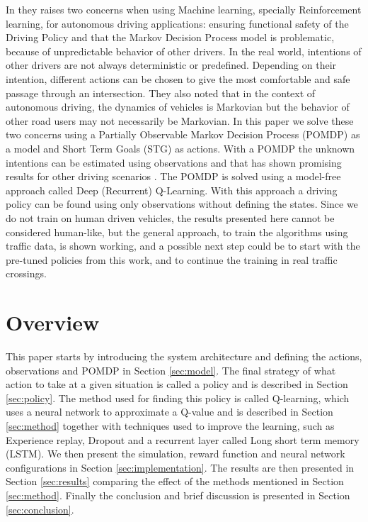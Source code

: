In \cite{Shalev2016} they raises two concerns when using Machine learning, specially Reinforcement learning, for autonomous driving applications: ensuring functional safety of the Driving Policy and that the Markov Decision Process model is problematic, because of unpredictable behavior of other drivers.
In the real world, intentions of other drivers are not always deterministic or predefined. Depending on their intention, different actions can be chosen to give the most comfortable and safe passage through an intersection.
They also noted that in the context of autonomous driving, the dynamics of vehicles is Markovian but the behavior of other road users may not necessarily be Markovian. In this paper we solve these two concerns using a Partially Observable Markov Decision Process (POMDP) as a model and Short Term Goals (STG) as actions. With a POMDP the unknown intentions can be estimated using observations and that has shown promising results for other driving scenarios \cite{Brechtel2014}. The POMDP is solved using a model-free approach called Deep (Recurrent) Q-Learning. With this approach a driving policy can be found using only observations without defining the states. Since we do not train on human driven vehicles, the results presented here cannot be considered  human-like, but the general approach, to train the algorithms using traffic data, is shown working, and  a possible next step could be to start with the pre-tuned policies from this work, and to continue the training in real traffic crossings.

\section{Overview}
This paper starts by introducing the system architecture and defining the actions, observations and POMDP in Section \ref{sec:model}. The final strategy of what action to take at a given situation is called a policy and is described in Section \ref{sec:policy}. The method used for finding this policy is called Q-learning, which uses a neural network to approximate a Q-value and is described in Section \ref{sec:method} together with techniques used to improve the learning, such as Experience replay, Dropout and a recurrent layer called Long short term memory (LSTM). We then present the simulation, reward function and neural network configurations in Section \ref{sec:implementation}. The results are then presented in Section \ref{sec:results} comparing the effect of the methods mentioned in Section \ref{sec:method}. Finally the conclusion and brief discussion is presented in Section \ref{sec:conclusion}.


